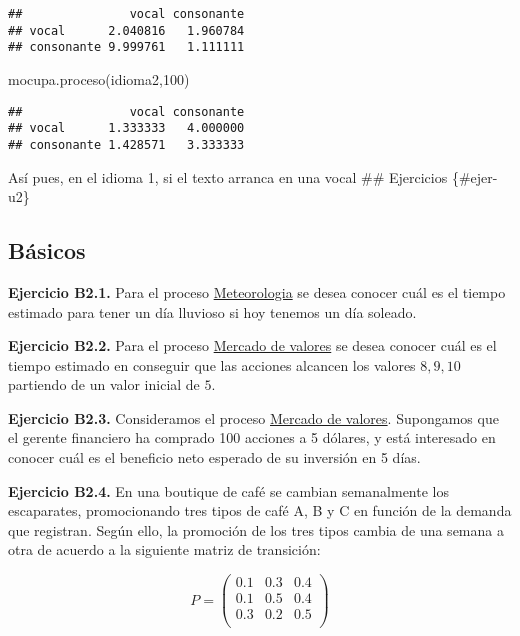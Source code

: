 \documentclass[
]{book}
\newenvironment{Shaded}{\begin{snugshade}}{\end{snugshade}}
\newcommand{\DecValTok}[1]{\textcolor[rgb]{0.00,0.00,0.81}{#1}}
\newcommand{\FunctionTok}[1]{\textcolor[rgb]{0.00,0.00,0.00}{#1}}
\newcommand{\NormalTok}[1]{#1}
\theoremstyle{definition}
\theoremstyle{definition}
\theoremstyle{definition}
\theoremstyle{definition}
\theoremstyle{remark}
\begin{document}
\begin{verbatim}
##               vocal consonante
## vocal      2.040816   1.960784
## consonante 9.999761   1.111111
\end{verbatim}

\begin{Shaded}
\begin{Highlighting}[]
\FunctionTok{mocupa.proceso}\NormalTok{(idioma2,}\DecValTok{100}\NormalTok{)}
\end{Highlighting}
\end{Shaded}

\begin{verbatim}
##               vocal consonante
## vocal      1.333333   4.000000
## consonante 1.428571   3.333333
\end{verbatim}

Así pues, en el idioma 1, si el texto arranca en una vocal \#\# Ejercicios \{\#ejer-u2\}

\hypertarget{buxe1sicos-1}{%
\subsection{Básicos}\label{buxe1sicos-1}}

\textbf{Ejercicio B2.1.} Para el proceso \protect\hyperlink{meteo}{Meteorologia} se desea conocer cuál es el tiempo estimado para tener un día lluvioso si hoy tenemos un día soleado.

\textbf{Ejercicio B2.2.} Para el proceso \protect\hyperlink{mercadovalores}{Mercado de valores} se desea conocer cuál es el tiempo estimado en conseguir que las acciones alcancen los valores \(8, 9, 10\) partiendo de un valor inicial de \(5\).

\textbf{Ejercicio B2.3.} Consideramos el proceso \protect\hyperlink{mercadovalores}{Mercado de valores}. Supongamos que el gerente financiero ha comprado 100 acciones a 5 dólares, y está interesado en conocer cuál es el beneficio neto esperado de su inversión en 5 días.

\textbf{Ejercicio B2.4.} En una boutique de café se cambian semanalmente los escaparates, promocionando tres tipos de café A, B y C en función de la demanda que registran. Según ello, la promoción de los tres tipos cambia de una semana a otra de acuerdo a la siguiente matriz de transición:

\[P = 
\begin{pmatrix}
0.1 & 0.3 & 0.4\\
0.1 & 0.5 & 0.4\\
0.3 & 0.2 & 0.5\\
\end{pmatrix}\]
\end{document}
